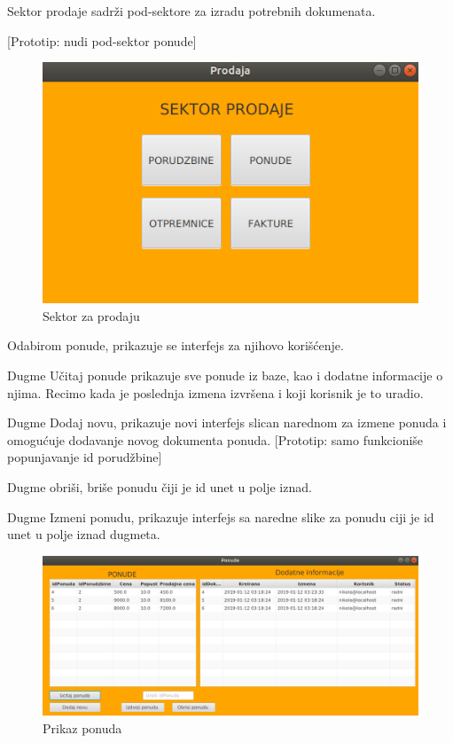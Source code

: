 \clearpage

Sektor prodaje sadrži pod-sektore za izradu potrebnih dokumenata.

[Prototip: nudi pod-sektor ponude]

\begin{figure}[ht]
\centering
\includegraphics[width=165mm]{slike/UI-3.png}%
\caption{Sektor za prodaju}
\end{figure}

\clearpage

Odabirom ponude, prikazuje se interfejs za njihovo korišćenje. 

Dugme Učitaj ponude prikazuje sve ponude iz baze, kao i dodatne informacije o njima. Recimo kada je poslednja izmena izvršena i koji korisnik je to uradio.

Dugme Dodaj novu, prikazuje novi interfejs slican narednom za izmene ponuda i omogućuje dodavanje novog dokumenta ponuda.
[Prototip: samo funkcioniše popunjavanje id porudžbine]

Dugme obriši, briše ponudu čiji je id unet u polje iznad.

Dugme Izmeni ponudu, prikazuje interfejs sa naredne slike za ponudu ciji je id unet u polje iznad dugmeta.

\begin{figure}[ht]
\centering
\includegraphics[width=165mm]{slike/UI-4.png}%
\caption{Prikaz ponuda}
\end{figure}

